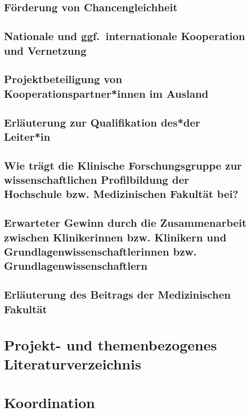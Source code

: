 \documentclass[german, 53.02]{proposal}
\begin{document}
\subsection{Förderung von Chancengleichheit}

\subsection{Nationale und ggf.\ internationale Kooperation und Vernetzung}

\subsection{Projektbeteiligung von Kooperationspartner*innen im Ausland}

\subsection{Erläuterung zur Qualifikation des*der Leiter*in}

\subsection{Wie trägt die Klinische Forschungsgruppe zur wissenschaftlichen Profilbildung der Hochschule bzw. Medizinischen Fakultät bei?}

\subsection{Erwarteter Gewinn durch die Zusammenarbeit zwischen Klinikerinnen bzw. Klinikern und Grundlagenwissenschaftlerinnen bzw. Grundlagenwissenschaftlern}

\subsection{Erläuterung des Beitrags der Medizinischen Fakultät}


\section{Projekt- und themenbezogenes Literaturverzeichnis}
\printbibliography[heading=none]


\section{Koordination}
\end{document}
